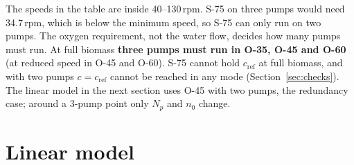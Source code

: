 \documentclass[11pt]{article}
\begin{document}
\begin{center}

\end{center}

The speeds in the table are inside 40--130\,rpm. S-75 on three pumps would need 34.7\,rpm, which
is below the minimum speed, so S-75 can only run on two pumps. The oxygen requirement, not the
water flow, decides how many pumps must run. At full biomass \textbf{three pumps must run in
O-35, O-45 and O-60} (at reduced speed in O-45 and O-60). S-75 cannot hold $c_\text{ref}$ at
full biomass, and with two pumps $c=c_\text{ref}$ cannot be reached in any mode
(Section~\ref{sec:checks}).
The linear model in the next section uses O-45 with two pumps, the redundancy case; around a
3-pump point only $N_p$ and $n_0$ change.

\section{Linear model}\label{sec:linear}
\end{document}

